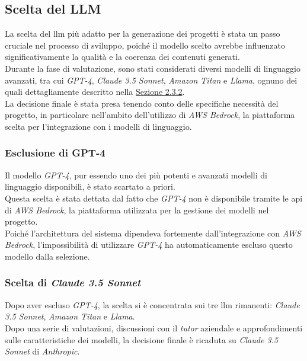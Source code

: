\subsection{Scelta del LLM}
\label{subsec:scelta-llm}

La scelta del \gls{llm} più adatto per la generazione dei progetti è stata un passo cruciale nel processo di sviluppo, poiché il modello scelto avrebbe influenzato significativamente la qualità e la coerenza dei contenuti generati.\\
Durante la fase di valutazione, sono stati considerati diversi modelli di linguaggio avanzati, tra cui \textit{GPT-4}, \textit{Claude 3.5 Sonnet}, \textit{Amazon Titan} e \textit{Llama}, ognuno dei quali dettagliamente descritto nella {\hyperref[subsec:llm-confronto]{Sezione 2.3.2}}.\\

\noindent La decisione finale è stata presa tenendo conto delle specifiche necessità del progetto, in particolare nell'ambito dell'utilizzo di \textit{AWS Bedrock}, la piattaforma scelta per l'integrazione con i modelli di linguaggio.

\subsubsection{Esclusione di GPT-4}

Il modello \textit{GPT-4}, pur essendo uno dei più potenti e avanzati modelli di linguaggio disponibili, è stato scartato a priori.\\
Questa scelta è stata dettata dal fatto che \textit{GPT-4} non è disponibile tramite le \gls{api} di \textit{AWS Bedrock}, la piattaforma utilizzata per la gestione dei modelli nel progetto.\\
Poiché l'architettura del sistema dipendeva fortemente dall'integrazione con \textit{AWS Bedrock}, l'impossibilità di utilizzare \textit{GPT-4} ha automaticamente escluso questo modello dalla selezione.

\subsubsection{Scelta di \textit{Claude 3.5 Sonnet}}

Dopo aver escluso \textit{GPT-4}, la scelta si è concentrata sui tre \gls{llm} rimanenti: \textit{Claude 3.5 Sonnet}, \textit{Amazon Titan} e \textit{Llama}. \\
Dopo una serie di valutazioni, discussioni con il \textit{tutor} aziendale e approfondimenti sulle caratteristiche dei modelli, la decisione finale è ricaduta su \textit{Claude 3.5 Sonnet} di \textit{Anthropic}.\\

